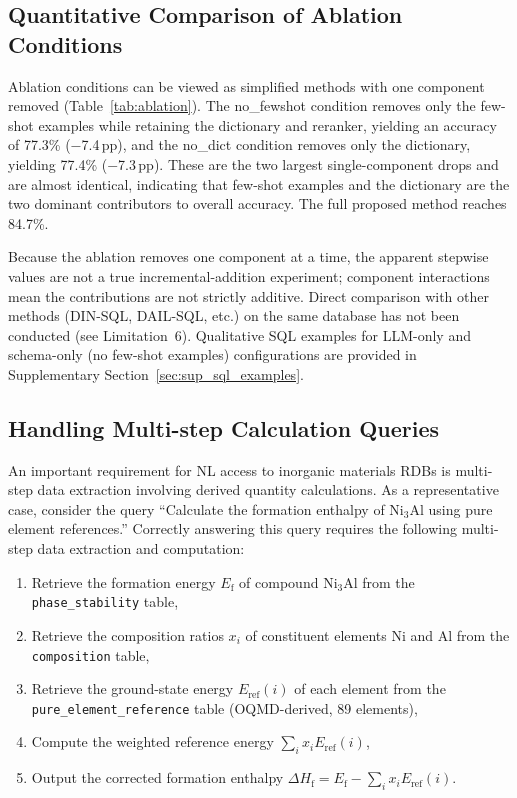 \documentclass{npj-compt.mater}
\begin{document}
\subsection{Quantitative Comparison of Ablation Conditions}

Ablation conditions can be viewed as simplified methods with one
component removed (Table~\ref{tab:ablation}).
The no\_fewshot condition removes only the few-shot examples while
retaining the dictionary and reranker, yielding an accuracy of
77.3\% ($-$7.4\,pp), and the no\_dict condition removes only the
dictionary, yielding 77.4\% ($-$7.3\,pp). These are the two largest
single-component drops and are almost identical, indicating that
few-shot examples and the dictionary are the two dominant
contributors to overall accuracy.
The full proposed method reaches 84.7\%.

Because the ablation removes one component at a time, the apparent
stepwise values are not a true incremental-addition experiment;
component interactions mean the contributions are not strictly
additive.
Direct comparison with other methods (DIN-SQL, DAIL-SQL, etc.) on
the same database has not been conducted (see Limitation~6).
Qualitative SQL examples for LLM-only and schema-only (no few-shot
examples) configurations are provided in
Supplementary Section~\ref{sec:sup_sql_examples}.

\subsection{Handling Multi-step Calculation Queries}
\label{sec:multistep_query}

An important requirement for NL access to inorganic materials RDBs
is multi-step data extraction involving derived quantity calculations.
As a representative case, consider the query ``Calculate the
formation enthalpy of Ni$_3$Al using pure element references.''
Correctly answering this query requires the following multi-step
data extraction and computation:
\begin{enumerate}
  \item Retrieve the formation energy $E_\mathrm{f}$ of compound
    Ni$_3$Al from the \texttt{phase\_stability} table,
  \item Retrieve the composition ratios $x_i$ of constituent
    elements Ni and Al from the \texttt{composition} table,
  \item Retrieve the ground-state energy $E_\mathrm{ref}(i)$ of
    each element from the \texttt{pure\_element\_reference} table
    (OQMD-derived, 89 elements),
  \item Compute the weighted reference energy
    $\sum_i x_i E_\mathrm{ref}(i)$,
  \item Output the corrected formation enthalpy
    $\Delta H_\mathrm{f} = E_\mathrm{f} - \sum_i x_i E_\mathrm{ref}(i)$.
\end{enumerate}
\end{document}
